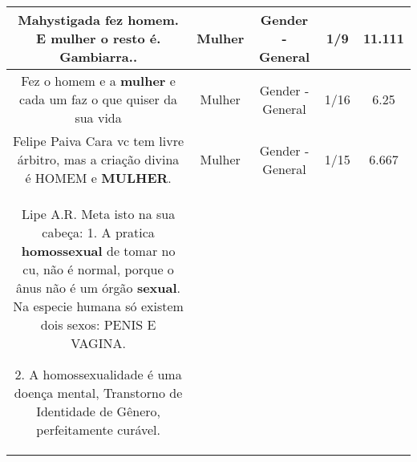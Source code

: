 \documentclass[11pt]{article}
\newlength\mylength
\begin{document}
\begin{center}
\begin{longtable}{|C{.65\mylength}|C{.30\mylength}|C{.12\mylength}|C{.12\mylength}|C{.12\mylength}|}
  \small Mahystigada fez homem. E \textbf{mulher} o resto é. Gambiarra..\normalsize   & Mulher & Gender - General & 1/9 & 11.111 \\  \hline
  \small Fez o homem e a \textbf{mulher} e cada um faz o que quiser da sua vida\normalsize   & Mulher & Gender - General & 1/16 & 6.25 \\  \hline
  \small Felipe Paiva Cara vc tem livre árbitro, mas a criação divina é HOMEM e \textbf{MULHER}.\normalsize   & Mulher & Gender - General & 1/15 & 6.667 \\  \hline
  \small Lipe A.R. Meta isto na sua cabeça:
1. A pratica \textbf{homossexual} de tomar no cu, não é normal, porque o ânus não é um órgão \textbf{sexual}. Na especie humana só existem dois sexos: PENIS E VAGINA.

2. A homossexualidade é uma doença mental, Transtorno de Identidade de Gênero, perfeitamente curável.


\end{longtable}
\end{center}
\end{document}
